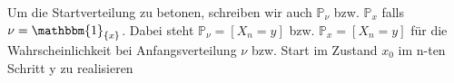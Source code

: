Um die Startverteilung zu betonen, schreiben wir auch $\mathbb{P}_{\nu}$ bzw. $\mathbb{P}_{x}$ falls $\nu = \mathbbm{1}_{ \lbrace x \rbrace}$.
Dabei steht $\mathbb{P}_{\nu} = [X_{n} = y]$ bzw. $\mathbb{P}_{x} = [X_{n} = y]$ für die Wahrscheinlichkeit bei Anfangsverteilung $\nu$ bzw. Start im Zustand $x_{0}$ im n-ten Schritt y zu realisieren
